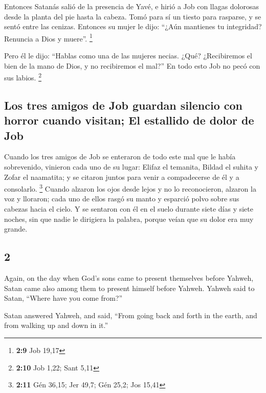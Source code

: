 \begin{paracol}{2}
 Entonces Satanás salió de la presencia de Yavé, e hirió a
Job con llagas dolorosas desde la planta del pie hasta la cabeza.
 Tomó para sí un tiesto para rasparse, y se sentó entre
las cenizas.  Entonces su mujer le dijo: ``¿Aún mantienes
tu integridad? Renuncia a Dios y muere''. \footnote{\textbf{2:9} Job
  19,17}

 Pero él le dijo: ``Hablas como una de las mujeres
necias. ¿Qué? ¿Recibiremos el bien de la mano de Dios, y no recibiremos
el mal?'' En todo esto Job no pecó con sus labios. \footnote{\textbf{2:10}
  Job 1,22; Sant 5,11}

\hypertarget{los-tres-amigos-de-job-guardan-silencio-con-horror-cuando-visitan-el-estallido-de-dolor-de-job}{%
\subsection{Los tres amigos de Job guardan silencio con horror cuando
visitan; El estallido de dolor de
Job}\label{los-tres-amigos-de-job-guardan-silencio-con-horror-cuando-visitan-el-estallido-de-dolor-de-job}}

 Cuando los tres amigos de Job se enteraron de todo este
mal que le había sobrevenido, vinieron cada uno de su lugar: Elifaz el
temanita, Bildad el suhita y Zofar el naamatita; y se citaron juntos
para venir a compadecerse de él y a consolarlo. \footnote{\textbf{2:11}
  Gén 36,15; Jer 49,7; Gén 25,2; Jos 15,41}  Cuando
alzaron los ojos desde lejos y no lo reconocieron, alzaron la voz y
lloraron; cada uno de ellos rasgó su manto y esparció polvo sobre sus
cabezas hacia el cielo.  Y se sentaron con él en el suelo
durante siete días y siete noches, sin que nadie le dirigiera la
palabra, porque veían que su dolor era muy grande.

\switchcolumn
\begin{otherlanguage}{english}

\hypertarget{section-3}{%
\section{2}\label{section-3}}

 Again, on the day when God's sons came to present
themselves before Yahweh, Satan came also among them to present himself
before Yahweh.  Yahweh said to Satan, ``Where have you
come from?''

Satan answered Yahweh, and said, ``From going back and forth in the
earth, and from walking up and down in it.''


\end{otherlanguage}
\end{paracol}
